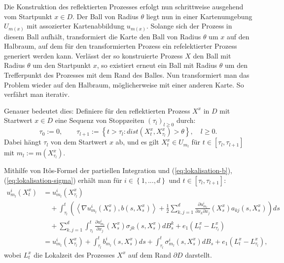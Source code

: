 \documentclass[10pt, a4paper, leqno, twoside, bibliography=totocnumbered, final]{scrartcl}
\theoremstyle{definition}
\theoremstyle{plain}%
\theoremstyle{remark}
\begin{document}
Die Konstruktion des reflektierten Prozesses erfolgt nun schrittweise ausgehend vom Startpunkt $ x \in D $. Der Ball von Radius $ \theta $ liegt nun in einer Kartenumgebung $ U_{m(x)} $ mit assozierter Kartenabbildung $ u_{m(x)} $. Solange sich der Prozess in diesem Ball aufhält, transformiert die Karte den Ball von Radius $ \theta $ um $ x $ auf den Halbraum, auf dem für den transformierten Prozess ein refelektierter Prozess generiert werden kann. Verlässt der so konstruierte Prozess $X$ den Ball mit Radius $ \theta $ um den Startpunkt $x$, so existiert erneut ein Ball mit Radius $ \theta $ um den Trefferpunkt des Prozesses mit dem Rand des Balles. Nun transformiert man das Problem wieder auf den Halbraum, möglicherweise mit einer anderen Karte. So verfährt man iterativ.

Genauer bedeutet dies: Definiere für den reflektierten Prozess $X^x$ in $D$ mit Startwert $ x \in D $ eine Sequenz von Stoppzeiten $ ( \tau_l )_{l \ge 0} $ durch:
\begin{equation*}
\tau_0 := 0, \qquad \tau_{l+1} := \left\lbrace t > \tau_l : dist ( X_t^x , X_{\tau_l}^x ) > \theta \right\rbrace, \quad l \ge 0.
\end{equation*} 
Dabei hängt $ \tau_l $ von dem Startwert $x$ ab, und es gilt $X_t^x \in U_{m_l} $ für $ t \in [\tau_l , \tau_{l+1} ] $ mit $ m_l := m( X_{\tau_l}^x)$.

Mithilfe von It\^{o}s-Formel der partiellen Integration und (\ref{eq:lokalisation-b}), (\ref{eq:lokalisation-sigma}) erhält man für $ i \in \left\lbrace 1, ... , d \right\rbrace $ und $ t \in [\tau_l , \tau_{l+1} ] $:
\begin{equation*}
\begin{split}
 u_{m_l}^i(X_t^x) & = u_{m_l}^i(X_{\tau_l}^x) \\
& \quad + \int_{\tau_l}^t \left( \left\langle \nabla u_{m_l}^i(X_s^x) , b(s,X_s^x) \right\rangle + \frac{1}{2} \sum_{k,j = 1}^d \frac{\partial u_{m_l}^i}{\partial x_k \partial x_j}(X_s^x) a_{kj}(s,X_s^x) \right) ds \\
& \quad + \sum_{k,j = 1}^d \int_{\tau_l}^t  \frac{\partial u_{m_l}^i}{\partial x_j}(X_s^x) \sigma_{jk}(s,X_s^x) dB_s^k + e_1 \left( L_t^x - L_{\tau_l}^x \right) \\
& = u_{m_l}^i(X_{\tau_l}^x) + \int_{\tau_l}^t b_{m_l}^i (s,X_{s}^x) ds + \int_{\tau_l}^t \sigma_{m_l}^i (s,X_s^x) dB_s + e_1 \left( L_t^x - L_{\tau_l}^x \right),
\end{split}
\end{equation*}
wobei $ L_t^x $ die Lokalzeit des Prozesses $X^x$ auf dem Rand $ \partial D $ darstellt. 
\end{document}
